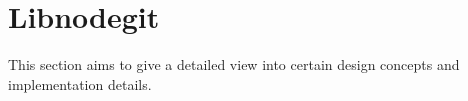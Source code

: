 \chapter{Libnodegit}

This section aims to give a detailed view into certain design concepts and
implementation details.
